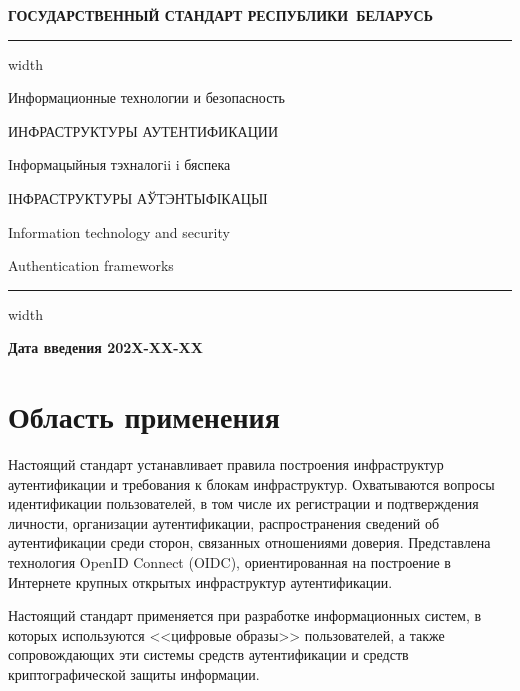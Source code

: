 \newpage
\setcounter{page}{1}
\pagestyle{headings}

\begin{center}
{\bfseries
ГОСУДАРСТВЕННЫЙ СТАНДАРТ РЕСПУБЛИКИ~БЕЛАРУСЬ
\vskip 2pt
\hrule width\textwidth

\vskip 9pt

Информационные технологии и безопасность

ИНФРАСТРУКТУРЫ АУТЕНТИФИКАЦИИ

\vskip 9pt

Iнформацыйныя тэхналогii i бяспека

ІНФРАСТРУКТУРЫ АЎТЭНТЫФІКАЦЫІ
}

\vskip 9pt

Information technology and security

Authentication frameworks

\vskip 4pt                
\hrule width \textwidth
\end{center}

\mbox{}\hfill{\bfseries Дата введения 202X-XX-XX}

\chapter{Область применения}\label{Scope}

Настоящий стандарт устанавливает правила построения инфраструктур 
аутентификации и требования к блокам инфраструктур. 
%        
Охватываются вопросы идентификации пользователей, в том числе их регистрации и
подтверждения личности, организации аутентификации, распространения сведений об
аутентификации среди сторон, связанных отношениями доверия.
%
Представлена технология OpenID Connect (OIDC), ориентированная на построение
в Интернете крупных открытых инфраструктур аутентификации.

Настоящий стандарт применяется при разработке информационных систем,
в которых используются <<цифровые образы>> пользователей, а также 
сопровождающих эти системы средств аутентификации и средств криптографической 
защиты информации.

